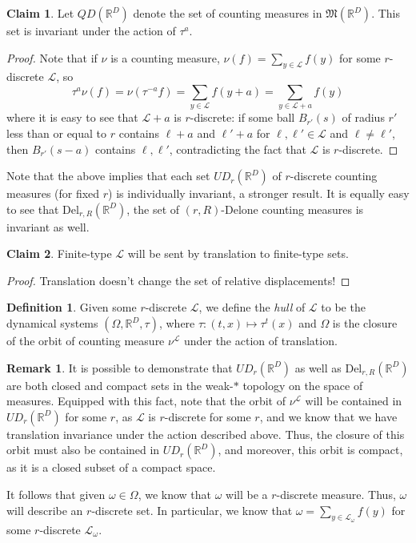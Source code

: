 \documentclass[aps,pra,showpacs,notitlepage,onecolumn,superscriptaddress,nofootinbib]{revtex4-1}
\theoremstyle{definition}
\newtheorem{definition}{Definition}[section]
\newtheorem{remark}{Remark}[section]
\newtheorem{claim}{Claim}[section]
\begin{document}
\begin{claim}
    Let $QD(\mathbb{R}^{D})$ denote the set of counting measures in $\mathfrak{M}(\mathbb{R}^{D})$. This set is invariant under the action of $\tau^{a}$.
\end{claim}
\begin{proof}
    Note that if $\nu$ is a counting measure, $\nu(f) = \sum_{y \in \mathcal{L}} f(y)$ for some $r$-discrete $\mathcal{L}$, so 
    $$\tau^{a} \nu(f) = \nu(\tau^{-a} f) = \sum_{y \in \mathcal{L}} f(y + a) = \sum_{y \in \mathcal{L} + a} f(y)$$
    where it is easy to see that $\mathcal{L} + a$ is $r$-discrete: if some ball $B_{r'}(s)$ of radius $r'$ less than or equal to $r$ contains $\ell + a$ and $\ell' + a$ for $\ell, \ell' \in \mathcal{L}$ and $\ell \neq \ell'$, then $B_{r'}(s - a)$ contains $\ell, \ell'$, contradicting the fact that $\mathcal{L}$ is $r$-discrete.
\end{proof}

\noindent Note that the above implies that each set $UD_r(\mathbb{R}^{D})$ of $r$-discrete counting measures (for fixed $r$) is individually invariant, a stronger result. It is equally easy to see that $\text{Del}_{r, R}(\mathbb{R}^{D})$, the set of $(r, R)$-Delone counting measures is invariant as well.

\begin{claim}
    Finite-type $\mathcal{L}$ will be sent by translation to finite-type sets.
\end{claim}
\begin{proof}
    Translation doesn't change the set of relative displacements!
\end{proof}

\begin{definition}
    Given some $r$-discrete $\mathcal{L}$, we define the \emph{hull} of $\mathcal{L}$ to be the dynamical systems $(\Omega, \mathbb{R}^{D}, \tau)$, where $\tau : (t, x) \mapsto \tau^{t}(x)$ and $\Omega$ is the closure of the orbit of counting measure $\nu^{\mathcal{L}}$ under the action of translation.
\end{definition}

\begin{remark}
    It is possible to demonstrate that $UD_r(\mathbb{R}^{D})$ as well as $\text{Del}_{r, R}(\mathbb{R}^{D})$ are both closed and compact sets in the weak-$*$ topology on the space of measures. Equipped with this fact, note that the orbit of $\nu^{\mathcal{L}}$ will be contained in $UD_r(\mathbb{R}^{D})$ for some $r$, as $\mathcal{L}$ is $r$-discrete for some $r$, and we know that we have translation invariance under the action described above. Thus, the closure of this orbit must also be contained in $UD_r(\mathbb{R}^{D})$, and moreover, this orbit is compact, as it is a closed subset of a compact space.

    It follows that given $\omega \in \Omega$, we know that $\omega$ will be a $r$-discrete measure. Thus, $\omega$ will describe an $r$-discrete set. In particular, we know that $\omega = \sum_{y \in \mathcal{L}_{\omega}} f(y)$ for some $r$-discrete $\mathcal{L}_{\omega}$.
\end{remark}
\end{document}
